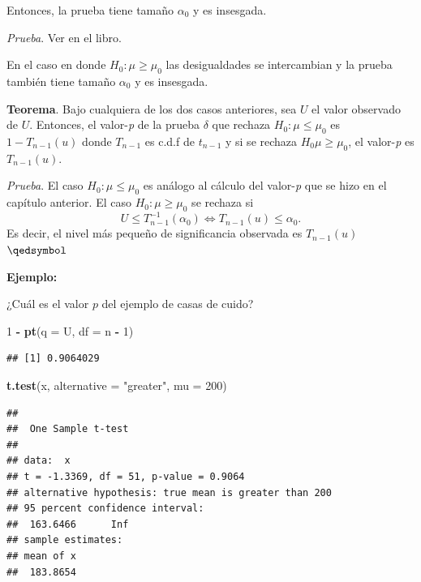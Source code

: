 \documentclass[
  12pt,
]{book}
\newenvironment{Shaded}{\begin{snugshade}}{\end{snugshade}}
\newcommand{\DataTypeTok}[1]{\textcolor[rgb]{0.13,0.29,0.53}{#1}}
\newcommand{\DecValTok}[1]{\textcolor[rgb]{0.00,0.00,0.81}{#1}}
\newcommand{\KeywordTok}[1]{\textcolor[rgb]{0.13,0.29,0.53}{\textbf{#1}}}
\newcommand{\NormalTok}[1]{#1}
\newcommand{\OperatorTok}[1]{\textcolor[rgb]{0.81,0.36,0.00}{\textbf{#1}}}
\newcommand{\StringTok}[1]{\textcolor[rgb]{0.31,0.60,0.02}{#1}}
\begin{document}
Entonces, la prueba tiene tamaño \(\alpha_0\) y es insesgada.

\emph{Prueba}. Ver en el libro.

En el caso en donde \(H_0:\mu\geq \mu_0\) las desigualdades se intercambian y la
prueba también tiene tamaño \(\alpha_0\) y es insesgada.

\textbf{Teorema}. Bajo cualquiera de los dos casos anteriores, sea \(U\) el valor
observado de \(U\). Entonces, el valor-\emph{p} de la prueba \(\delta\) que rechaza \(H_0: \mu\leq\mu_0\) es \(1-T_{n-1}(u)\) donde \(T_{n-1}\) es c.d.f de \(t_{n-1}\) y si se
rechaza \(H_0 \mu\geq \mu_0\), el valor-\emph{p} es \(T_{n-1}(u)\).

\emph{Prueba}. El caso \(H_0:\mu\leq\mu_0\) es análogo al cálculo del valor-\emph{p} que se
hizo en el capítulo anterior. El caso \(H_0: \mu\geq \mu_0\) se rechaza si \[U\leq
T_{n-1}^{-1}(\alpha_0) \Leftrightarrow T_{n-1}(u)\leq \alpha_0.\] Es decir, el
nivel más pequeño de significancia observada es \(T_{n-1}(u)\) \(\qedsymbol\)

\textbf{Ejemplo:}

¿Cuál es el valor \(p\) del ejemplo de casas de cuido?

\begin{Shaded}
\begin{Highlighting}[]
\DecValTok{1} \OperatorTok{{-}}\StringTok{ }\KeywordTok{pt}\NormalTok{(}\DataTypeTok{q =}\NormalTok{ U, }\DataTypeTok{df =}\NormalTok{ n }\OperatorTok{{-}}\StringTok{ }\DecValTok{1}\NormalTok{)}
\end{Highlighting}
\end{Shaded}

\begin{verbatim}
## [1] 0.9064029
\end{verbatim}

\begin{Shaded}
\begin{Highlighting}[]
\KeywordTok{t.test}\NormalTok{(x, }\DataTypeTok{alternative =} \StringTok{"greater"}\NormalTok{, }\DataTypeTok{mu =} \DecValTok{200}\NormalTok{)}
\end{Highlighting}
\end{Shaded}

\begin{verbatim}
## 
## 	One Sample t-test
## 
## data:  x
## t = -1.3369, df = 51, p-value = 0.9064
## alternative hypothesis: true mean is greater than 200
## 95 percent confidence interval:
##  163.6466      Inf
## sample estimates:
## mean of x 
##  183.8654
\end{verbatim}
\end{document}
